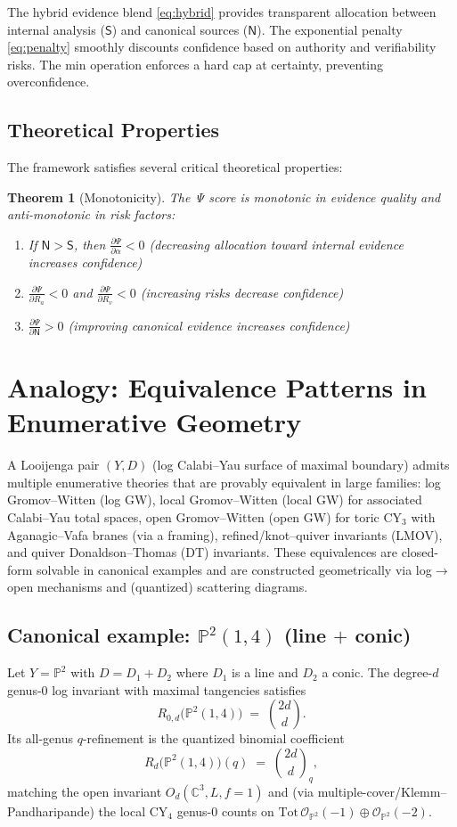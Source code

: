 \documentclass[12pt,a4paper]{article}
\newtheorem{theorem}{Theorem}
\newcommand{\Ssig}{\mathsf{S}}
\newcommand{\Nsig}{\mathsf{N}}
\newcommand{\alloc}{\alpha}
\newcommand{\rA}{R_a}
\newcommand{\rV}{R_v}
\newcommand{\score}{\Psi}
\begin{document}
The hybrid evidence blend \eqref{eq:hybrid} provides transparent allocation between internal analysis ($\Ssig$) and canonical sources ($\Nsig$). The exponential penalty \eqref{eq:penalty} smoothly discounts confidence based on authority and verifiability risks. The min operation enforces a hard cap at certainty, preventing overconfidence.

\subsection{Theoretical Properties}

The framework satisfies several critical theoretical properties:

\begin{theorem}[Monotonicity]
The Ψ score is monotonic in evidence quality and anti-monotonic in risk factors:
\begin{enumerate}
\item If $\Nsig > \Ssig$, then $\frac{\partial \score}{\partial \alloc} < 0$ (decreasing allocation toward internal evidence increases confidence)
\item $\frac{\partial \score}{\partial \rA} < 0$ and $\frac{\partial \score}{\partial \rV} < 0$ (increasing risks decrease confidence)
\item $\frac{\partial \score}{\partial \Nsig} > 0$ (improving canonical evidence increases confidence)
\end{enumerate}
\end{theorem}
\section{Analogy: Equivalence Patterns in Enumerative Geometry}

A Looijenga pair $(Y,D)$ (log Calabi–Yau surface of maximal boundary) admits multiple enumerative theories that are provably equivalent in large families: log Gromov–Witten (log GW), local Gromov–Witten (local GW) for associated Calabi–Yau total spaces, open Gromov–Witten (open GW) for toric CY$_3$ with Aganagic–Vafa branes (via a framing), refined/knot–quiver invariants (LMOV), and quiver Donaldson–Thomas (DT) invariants. These equivalences are closed-form solvable in canonical examples and are constructed geometrically via log$\to$open mechanisms and (quantized) scattering diagrams.

\subsection{Canonical example: $ \mathbb{P}^2(1,4)$ (line $+$ conic)}
Let $Y=\mathbb{P}^2$ with $D=D_1+D_2$ where $D_1$ is a line and $D_2$ a conic. The degree-$d$ genus-0 log invariant with maximal tangencies satisfies
\[
R_{0,d}\big(\mathbb{P}^2(1,4)\big)\;=\;\binom{2d}{d}.
\]
Its all-genus $q$-refinement is the quantized binomial coefficient
\[
R_d\big(\mathbb{P}^2(1,4)\big)(q)\;=\;\binom{2d}{d}_q,
\]
matching the open invariant $O_d(\mathbb{C}^3,L, f{=}1)$ and (via multiple-cover/Klemm–Pandharipande) the local CY$_4$ genus-0 counts on $\mathrm{Tot}\,\mathcal{O}_{\mathbb{P}^2}(-1)\oplus\mathcal{O}_{\mathbb{P}^2}(-2)$.
\end{document}
